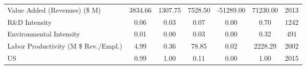 {\begin{tabular}{l*{1}{cccccc}}
Value Added (Revenues) (\$ M)&     3834.66&     1307.75&     7528.50&   -51289.00&    71230.00&        2013\\
R\&D Intensity      &        0.06&        0.03&        0.07&        0.00&        0.70&        1242\\
Environmental Intensity&        0.01&        0.00&        0.03&        0.00&        0.32&         491\\
Labor Productivity (M \$ Rev./Empl.)&        4.99&        0.36&       78.85&        0.02&     2228.29&        2002\\
US                  &        0.99&        1.00&        0.11&        0.00&        1.00&        2015\\
\hline\hline
\end{tabular}
}
